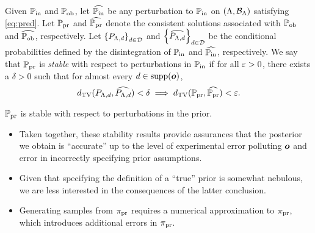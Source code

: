 \begin{frame}[t]
\begin{defn}\label{defn:stableprior}
Given $\operatorname*{\mathbb{P}_{in}}$ and $\operatorname*{\mathbb{P}_{ob}}$, let $\widehat{\operatorname*{\mathbb{P}_{in}}}$ be any perturbation to $\operatorname*{\mathbb{P}_{in}}$ on $({\Lambda}, \mathcal{B}_{{\Lambda}})$ satisfying \eqref{eq:pred}.
Let $\operatorname*{\mathbb{P}_{pr}}$ and $\widehat{\operatorname*{\mathbb{P}_{pr}}}$ denote the consistent solutions associated with $\operatorname*{\mathbb{P}_{ob}}$ and $\widehat{\operatorname*{\mathbb{P}_{ob}}}$, respectively.
Let $\left\{P_{{\Lambda}, d}\right\}_{d\in\mathcal{D}}^{}$ and $\left\{\widehat{P_{{\Lambda}, d}}\right\}_{d\in\mathcal{D}}^{}$ be the conditional probabilities defined by the disintegration of $\operatorname*{\mathbb{P}_{in}}$ and $\widehat{\operatorname*{\mathbb{P}_{in}}}$, respectively.
We say that $\operatorname*{\mathbb{P}_{pr}}$ is \emph{stable} with respect to perturbations in $\operatorname*{\mathbb{P}_{in}}$ if for all $\varepsilon > 0$, there exists a $\delta > 0$ such that for almost every $d\in\text{supp}(\operatorname*{\boldsymbol{o}})$,
\begin{equation}\label{eq:stableprior}
d_{\text{TV}} (P_{{\Lambda}, d}, \widehat{P_{{\Lambda}, d}}) < \delta \implies d_{\text{TV}} (\operatorname*{\mathbb{P}_{pr}}, \widehat{\operatorname*{\mathbb{P}_{pr}}}) < \varepsilon.
\end{equation}
\end{defn}

\begin{theorem}
$\operatorname*{\mathbb{P}_{pr}}$ is stable with respect to perturbations in the prior.
\label{thm:stableprior}
\end{theorem}


\end{frame}

\begin{frame}[t]
\begin{itemize}

	\item Taken together, these stability results provide assurances that the posterior we obtain is ``accurate'' up to the level of experimental error polluting $\operatorname*{\boldsymbol{o}}$ and error in incorrectly specifying prior assumptions.
	\item Given that specifying the definition of a ``true'' prior is somewhat nebulous, we are less interested in the consequences of the latter conclusion.
	\item Generating samples from $\operatorname*{\pi_{pr}}$ requires a numerical approximation to $\operatorname*{\pi_{pr}}$, which introduces additional errors in $\operatorname*{\pi_{pr}}$.

\end{itemize}

\end{frame}


